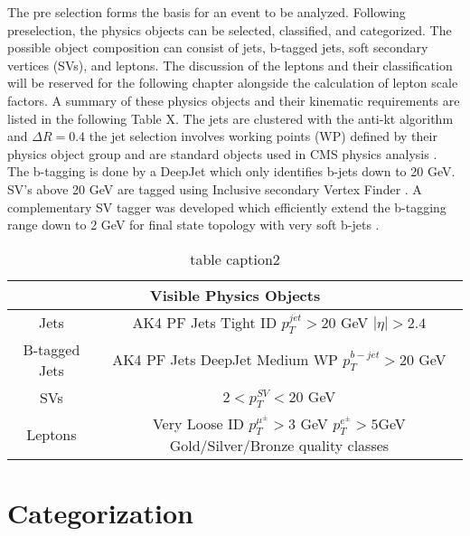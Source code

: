 The pre selection forms the basis for an event to be analyzed. Following preselection, the physics objects can be selected, classified, and categorized. The possible object composition can consist of jets, b-tagged jets, soft secondary vertices (SVs), and leptons. The discussion of the leptons and their classification will be reserved for the following chapter alongside the calculation of lepton scale factors. A summary of these physics objects and their kinematic requirements are listed in the following Table X. The jets are clustered with the anti-kt algorithm and $\Delta R = 0.4$ \cite{Cacciari:2008gp} the jet selection involves working points (WP) defined by their physics object group and are standard objects used in CMS physics analysis \cite{CMS:2010xta}. The b-tagging is done by a DeepJet \cite{Stoye:2018qgr} which only identifies b-jets down to 20 GeV. SV's above 20 GeV are tagged using Inclusive secondary Vertex Finder \cite{CMS:2011yuk}. A complementary SV tagger was developed which efficiently extend the b-tagging range down to 2 GeV for final state topology with very soft b-jets \cite{erich}.


\begin{table}
\centering
\label{tab:physicsobjects}
\caption{table caption2}
\begin{tabular}{c|c}
\hline 
\multicolumn{2}{c}{Visible Physics Objects} \\ 
\hline 
\hline
Jets & \makecell{AK4 PF Jets \\ Tight ID \\ $p_T^{jet} > 20$ GeV \\ $|\eta|>2.4$} \\ 
\hline
B-tagged Jets & \makecell{AK4 PF Jets \\ DeepJet Medium WP \\ $p_T^{b-jet} > 20 $ GeV}  \\ 
\hline
SVs & $2<p_T^{SV}<20$ GeV \\ 
\hline
Leptons & \makecell{Very Loose ID \\ $p_T^{\mu^\pm} > 3$ GeV \\ $p_T^{e^\pm} > 5 $GeV \\ Gold/Silver/Bronze quality classes} \\ 
\hline 
\end{tabular} 
\end{table}

\section{Categorization}

